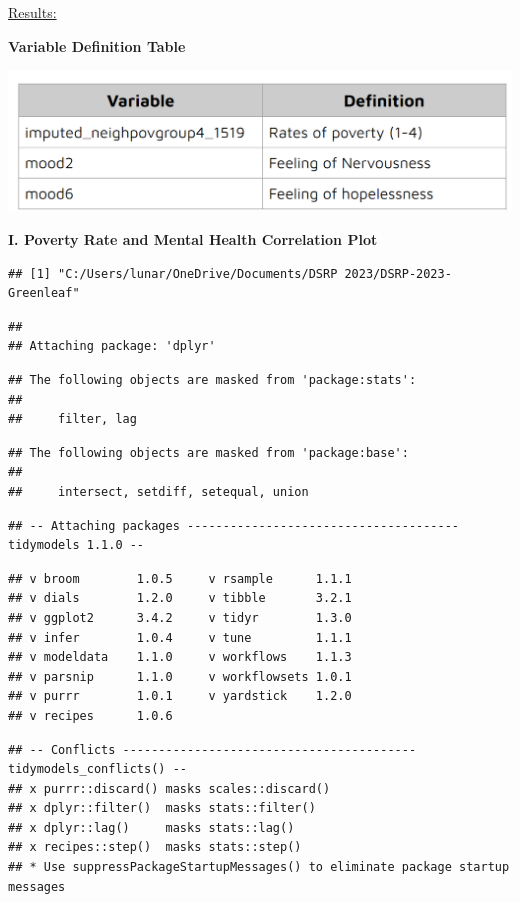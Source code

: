 \documentclass[
]{article}
\begin{document}
\ul{Results:}

\textbf{Variable Definition Table}

\includegraphics{images/Screenshot 2023-08-08 142431.png}

\textbf{I. Poverty Rate and Mental Health Correlation Plot}

\begin{verbatim}
## [1] "C:/Users/lunar/OneDrive/Documents/DSRP 2023/DSRP-2023-Greenleaf"
\end{verbatim}

\begin{verbatim}
## 
## Attaching package: 'dplyr'
\end{verbatim}

\begin{verbatim}
## The following objects are masked from 'package:stats':
## 
##     filter, lag
\end{verbatim}

\begin{verbatim}
## The following objects are masked from 'package:base':
## 
##     intersect, setdiff, setequal, union
\end{verbatim}

\begin{verbatim}
## -- Attaching packages -------------------------------------- tidymodels 1.1.0 --
\end{verbatim}

\begin{verbatim}
## v broom        1.0.5     v rsample      1.1.1
## v dials        1.2.0     v tibble       3.2.1
## v ggplot2      3.4.2     v tidyr        1.3.0
## v infer        1.0.4     v tune         1.1.1
## v modeldata    1.1.0     v workflows    1.1.3
## v parsnip      1.1.0     v workflowsets 1.0.1
## v purrr        1.0.1     v yardstick    1.2.0
## v recipes      1.0.6
\end{verbatim}

\begin{verbatim}
## -- Conflicts ----------------------------------------- tidymodels_conflicts() --
## x purrr::discard() masks scales::discard()
## x dplyr::filter()  masks stats::filter()
## x dplyr::lag()     masks stats::lag()
## x recipes::step()  masks stats::step()
## * Use suppressPackageStartupMessages() to eliminate package startup messages
\end{verbatim}
\end{document}
